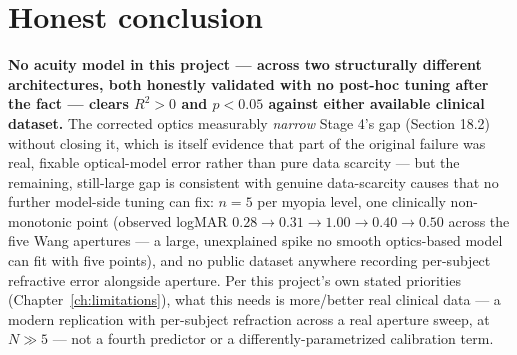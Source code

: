 \section{Honest conclusion}

\textbf{No acuity model in this project --- across two structurally different
architectures, both honestly validated with no post-hoc tuning after the fact --- clears
$R^2>0$ and $p<0.05$ against either available clinical dataset.} The corrected optics
measurably \emph{narrow} Stage 4's gap (Section 18.2) without closing it, which is
itself evidence that part of the original failure was real, fixable optical-model
error rather than pure data scarcity --- but the remaining, still-large gap is
consistent with genuine data-scarcity causes that no further model-side tuning can fix:
$n=5$ per myopia level, one clinically non-monotonic point (observed logMAR
$0.28\to0.31\to\mathbf{1.00}\to0.40\to0.50$ across the five Wang apertures --- a large,
unexplained spike no smooth optics-based model can fit with five points), and no
public dataset anywhere recording per-subject refractive error alongside aperture. Per
this project's own stated priorities (Chapter~\ref{ch:limitations}), what this needs
is more/better real clinical data --- a modern replication with per-subject refraction
across a real aperture sweep, at $N\gg5$ --- not a fourth predictor or a
differently-parametrized calibration term.
